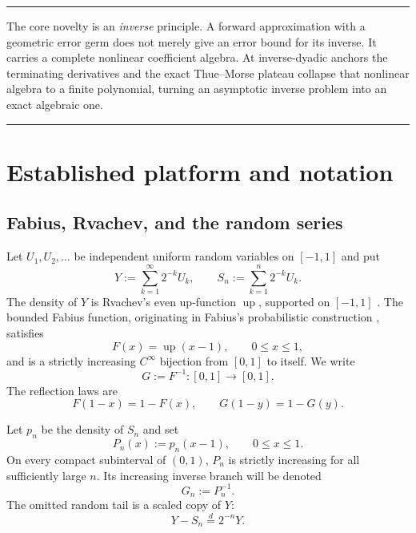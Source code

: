 \documentclass[11pt,oneside]{article}
\numberwithin{equation}{section}
\theoremstyle{definition}
\theoremstyle{remark}
\newcommand{\Up}{\operatorname{up}}
\newcommand{\InvF}{G}
\newcommand{\Fn}{P_n}
\newcommand{\Gn}{G_n}
\newenvironment{boxedremark}{%
  \par\smallskip\noindent\begin{center}\begin{minipage}{0.94\textwidth}%
  \color{black}\hrule\vspace{0.6em}\small
}{%
  \vspace{0.6em}\hrule\end{minipage}\end{center}\smallskip
}
\begin{document}
\begin{boxedremark}
The core novelty is an \emph{inverse} principle.  A forward approximation with a geometric
error germ does not merely give an error bound for its inverse.  It carries a complete
nonlinear coefficient algebra.  At inverse-dyadic anchors the terminating derivatives and
the exact Thue--Morse plateau collapse that nonlinear algebra to a finite polynomial, turning
an asymptotic inverse problem into an exact algebraic one.
\end{boxedremark}

\section{Established platform and notation}
\label{sec:platform}

\subsection{Fabius, Rvachev, and the random series}

Let $U_1,U_2,\ldots$ be independent uniform random variables on $[-1,1]$ and put
\begin{equation}
 Y:=\sum_{k=1}^{\infty}2^{-k}U_k,
 \qquad
 S_n:=\sum_{k=1}^{n}2^{-k}U_k.
 \label{eq:Y-prefix}
\end{equation}
The density of $Y$ is Rvachev's even up-function $\Up$, supported on $[-1,1]$ \cite{Rvachev1990,Arias1982,ProveItPrimary}.
The bounded Fabius function, originating in Fabius's probabilistic construction \cite{Fabius1966}, satisfies
\begin{equation}
 F(x)=\Up(x-1),\qquad 0\le x\le1,
 \label{eq:F-up-shift}
\end{equation}
and is a strictly increasing $C^\infty$ bijection from $[0,1]$ to itself.  We write
\begin{equation}
 \InvF:=F^{-1}:[0,1]\longrightarrow[0,1].
 \label{eq:G-def}
\end{equation}
The reflection laws are
\begin{equation}
 F(1-x)=1-F(x),\qquad \InvF(1-y)=1-\InvF(y).
 \label{eq:reflection}
\end{equation}

Let $p_n$ be the density of $S_n$ and set
\begin{equation}
 \Fn(x):=p_n(x-1),\qquad 0\le x\le1.
 \label{eq:Pn-def}
\end{equation}
On every compact subinterval of $(0,1)$, $\Fn$ is strictly increasing for all sufficiently
large $n$.  Its increasing inverse branch will be denoted
\begin{equation}
 \Gn:=\Fn^{-1}.
 \label{eq:Gn-def}
\end{equation}
The omitted random tail is a scaled copy of $Y$:
\begin{equation}
 Y-S_n\stackrel{d}=2^{-n}Y.
 \label{eq:tail-copy}
\end{equation}
\end{document}
